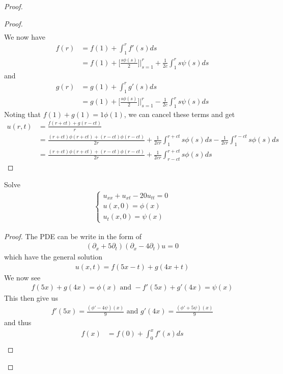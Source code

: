 \documentclass{report}
\begin{document}
\begin{proof}
\begin{proof}
\begin{align*}
\end{align*}
We now have 
\begin{align*}
f(r)&= f(1)+\int_1^{r} f'(s)ds   \\
&=f(1)+ \Big[\frac{s \phi (s)}{2} \Big] \Big|_{s=1}^{r} + \frac{1}{2c}\int_1^r s \psi (s)ds
\end{align*}
and 
\begin{align*}
g(r)&=g(1)+ \int_1^r g'(s)ds \\
&=g(1)+ \Big[ \frac{s \phi (s)}{2} \Big]\Big|_{s=1}^r -\frac{1}{2c}\int_1^r s\psi (s)ds
\end{align*}
Noting that $f(1)+g(1)=1\phi (1)$, we can cancel these terms and get 
\begin{align*}
u(r,t)&= \frac{f(r+ct)+g(r-ct)}{r} \\
&= \frac{(r+ct)\phi (r+ct)+ (r-ct)\phi (r-ct)}{2r}+ \frac{1}{2cr}\int_1^{r+ct}s \phi (s)ds - \frac{1}{2cr}\int_1^{r-ct}s\phi (s)ds\\
&=\frac{(r+ct)\phi (r+ct)+ (r-ct)\phi (r-ct)}{2r}+ \frac{1}{2cr}\int_{r-ct}^{r+ct}s \phi (s)ds 
\end{align*}
\end{proof}
\begin{question}{}{}
Solve 
\begin{align*}
\begin{cases}
u_{xx}+u_{xt}-20u_{tt}=0 \\
u(x,0)=\phi (x) \\
u_t(x,0)= \psi (x)
\end{cases}
\end{align*}
\end{question}
\begin{proof}
The PDE can be write in the form of 
\begin{align*}
  (\partial_x + 5\partial_t) (\partial_x - 4 \partial _t)u=0
\end{align*}
which have the general solution 
\begin{align*}
u(x,t)=f(5x-t)+g(4x+t)
\end{align*}
We now see 
\begin{align*}
f(5x)+g(4x)=\phi (x)\text{ and }-f'(5x)+g'(4x)=\psi (x)
\end{align*}
This then give us 
\begin{align*}
f'(5x)=\frac{(\phi' - 4\psi)(x)}{9}\text{ and }g'(4x)= \frac{(\phi '+5\psi )(x)}{9}
\end{align*}
and thus 
\begin{align*}
f(x)&=f(0)+ \int_0^x f'(s)ds\\

\end{align*}
\end{proof}
\end{proof}
\end{document}
